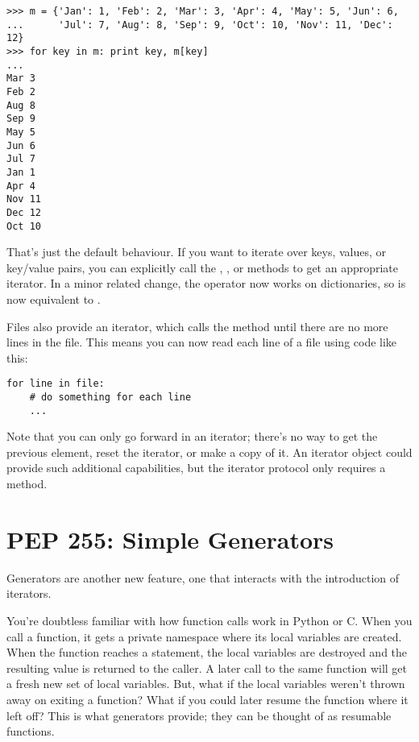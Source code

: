 \documentclass{howto}
\begin{document}
\begin{verbatim}
>>> m = {'Jan': 1, 'Feb': 2, 'Mar': 3, 'Apr': 4, 'May': 5, 'Jun': 6,
...      'Jul': 7, 'Aug': 8, 'Sep': 9, 'Oct': 10, 'Nov': 11, 'Dec': 12}
>>> for key in m: print key, m[key]
...
Mar 3
Feb 2
Aug 8
Sep 9
May 5
Jun 6
Jul 7
Jan 1
Apr 4
Nov 11
Dec 12
Oct 10
\end{verbatim}          

That's just the default behaviour.  If you want to iterate over keys,
values, or key/value pairs, you can explicitly call the
, , or 
methods to get an appropriate iterator.  In a minor related change,
the  operator now works on dictionaries, so
 is now equivalent to
.

Files also provide an iterator, which calls the 
method until there are no more lines in the file.  This means you can
now read each line of a file using code like this:

\begin{verbatim}
for line in file:
    # do something for each line
    ...
\end{verbatim}

Note that you can only go forward in an iterator; there's no way to
get the previous element, reset the iterator, or make a copy of it.
An iterator object could provide such additional capabilities, but the
iterator protocol only requires a  method.

\begin{seealso}


\end{seealso}


\section{PEP 255: Simple Generators}

Generators are another new feature, one that interacts with the
introduction of iterators.

You're doubtless familiar with how function calls work in Python or
C.  When you call a function, it gets a private namespace where its local
variables are created.  When the function reaches a 
statement, the local variables are destroyed and the resulting value
is returned to the caller.  A later call to the same function will get
a fresh new set of local variables.  But, what if the local variables
weren't thrown away on exiting a function?  What if you could later
resume the function where it left off?  This is what generators
provide; they can be thought of as resumable functions.
\end{document}
